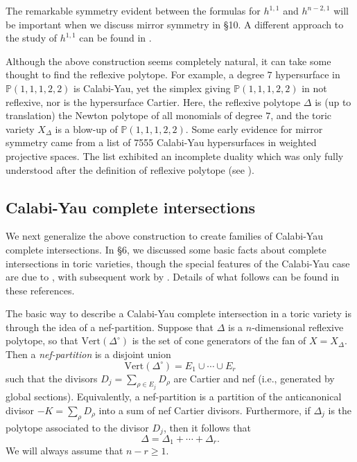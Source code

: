 \documentclass{amsart}
\theoremstyle{plain}
\theoremstyle{definition}
\begin{document}
	The remarkable symmetry evident between the formulas for
$h^{1,1}$ and $h^{n-2,1}$ will be important when we discuss mirror
symmetry in \S10.  A different approach to the study of $h^{1,1}$ can
be found in \cite{Roa1}.  

	Although the above construction seems completely natural, it
can take some thought to find the reflexive polytope.  For example, a
degree $7$ hypersurface in $\mathbb{P}(1,1,1,2,2)$ is Calabi-Yau, yet
the simplex giving $\mathbb{P}(1,1,1,2,2)$ in not reflexive, nor is the
hypersurface Cartier.  Here, the reflexive polytope $\Delta$ is (up to
translation) the Newton polytope of all monomials of degree $7$, and
the toric variety $X_\Delta$ is a blow-up of $\mathbb{P}(1,1,1,2,2)$.
Some early evidence for mirror symmetry came from a list of 7555
Calabi-Yau hypersurfaces in weighted projective spaces.  The list
exhibited an incomplete duality which was only fully understood after
the definition of reflexive polytope (see
\cite{CdK}).

	\subsection{Calabi-Yau complete intersections} We next
generalize the above construction to create families of Calabi-Yau
complete intersections.  In \S6, we discussed some basic facts about
complete intersections in toric varieties, though the special features
of the Calabi-Yau case are due to \cite{LBor}, with subsequent work by
\cite{BB1,BB2,BB3}.  Details of what follows can be found in these
references.

	The basic way to describe a Calabi-Yau complete intersection
in a toric variety is through the idea of a nef-partition.  Suppose
that $\Delta$ is a $n$-dimensional reflexive polytope, so that
$\mathrm{Vert}(\Delta^\circ)$ is the set of cone generators of the fan of
$X = X_\Delta$.  Then a {\it nef-partition\/} is a disjoint union
\begin{equation}
\mathrm{Vert}(\Delta^\circ) = E_1\cup\cdots\cup E_r
\tag{8.3}\label{eq:8.3}
\end{equation}
such that the divisors $D_j = \sum_{\rho\in E_j} D_\rho$ are Cartier
and nef (i.e., generated by global sections).  Equivalently, a
nef-partition is a partition of the anticanonical divisor $-K =
\sum_\rho D_\rho$ into a sum of nef Cartier divisors.  Furthermore, if
$\Delta_j$ is the polytope associated to the divisor $D_j$, then it
follows that
\begin{equation}
\Delta = \Delta_1 + \cdots + \Delta_r.
\tag{8.4}\label{eq:8.4}
\end{equation}
We will always assume that $n-r \ge 1$.
\end{document}
